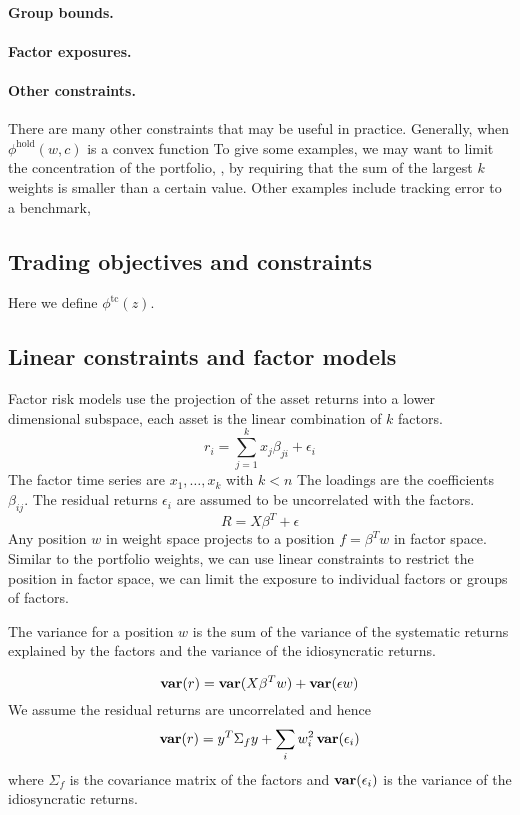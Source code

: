 \documentclass[12pt]{article}
\begin{document}
\paragraph{Group bounds.}

\paragraph{Factor exposures.}

\paragraph{Other constraints.}
There are many other constraints that may be useful in practice.
Generally, when $\phi^{\text{hold}}(w, c)$ is a convex function
To give some examples, we may want to limit the concentration of the portfolio,
\eg, by requiring that the sum of the largest $k$ weights is smaller than a
certain value. Other examples include tracking error to a benchmark,

\subsection{Trading objectives and constraints}
Here we define $\phi^{\text{tc}}(z)$.

\subsection{Linear constraints and factor models}

Factor risk models use the projection of the asset returns into a lower
dimensional subspace, \eg each asset is the linear combination of $k$ factors.
\[
r_i = \sum_{j=1}^k x_j \beta_{ji} + \epsilon_i
\]
The factor time series are $x_1, \ldots, x_k$ with $k < n$
The loadings are the coefficients $\beta_{ij}$.
The residual returns $\epsilon_i$ are assumed to be uncorrelated with the factors.
\[
  R = X \beta^T + \epsilon
\]
Any position $w$ in weight space projects to a position $f = \beta^T w$ in factor space.
Similar to the portfolio weights, we can use linear constraints to restrict
the position in factor space, \eg we can limit the exposure
to individual factors or groups of factors.

The variance for a position $w$ is the sum of the variance of the
systematic returns explained by the factors and the variance of the idiosyncratic returns.

\[
\mathop{\bf var}(r) = \mathop{\bf var}(X \beta^T w) + \mathop{\bf var}(\epsilon w)
\]
We assume the residual returns are uncorrelated and hence
\[
\mathop{\bf var}(r) = y^T \Sigma_f y + \sum_i w_i^2 \mathop{\bf var}(\epsilon_i)
\]
where $\Sigma_f$ is the covariance matrix of the factors and $\mathop{\bf var}(\epsilon_i)$
is the variance of the idiosyncratic returns.
\end{document}
